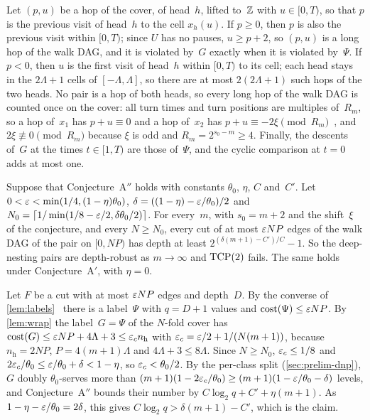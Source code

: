 \begin{informalproof}
Let $(p,u)$ be a hop of the cover, of head~$h$, lifted to~$\mathbb{Z}$ with $u\in[0,T)$, so that $p$ is the previous visit of
head~$h$ to the cell $x_h(u)$. If $p\ge0$, then $p$ is also the previous visit within $[0,T)$; since $U$ has no pauses,
$u\ge p+2$, so $(p,u)$ is a long hop of the walk DAG, and it is violated by~$G$ exactly when it is violated by~$\Psi$. If
$p<0$, then $u$ is the first visit of head~$h$ within $[0,T)$ to its cell; each head stays in the $2\Lambda+1$ cells of
$[-\Lambda,\Lambda]$, so there are at most $2(2\Lambda+1)$ such hops of the two heads. No pair is a hop of both heads, so
every long hop of the walk DAG is counted once on the cover: all turn times and turn positions are multiples of~$R_m$, so
a hop of~$x_1$ has $p+u\equiv0$ and a hop of~$x_2$ has $p+u\equiv-2\xi\pmod{R_m}$~\cite[Remark~5.23]{FourthPaper2026}, and
$2\xi\not\equiv0\pmod{R_m}$ because $\xi$ is odd and $R_m=2^{s_0-m}\ge4$. Finally, the descents of~$G$ at the times
$t\in[1,T)$ are those of~$\Psi$, and the cyclic comparison at $t=0$ adds at most one.
\end{informalproof}

\begin{corollary}\label{cor:wrap}
\notformalized
Suppose that Conjecture~A$''$ holds with constants $\theta_0$, $\eta$, $C$ and~$C'$. Let $0<\varepsilon<\min(1/4,(1-\eta)\theta_0)$,
$\delta=((1-\eta)-\varepsilon/\theta_0)/2$ and $N_0=\lceil1/\min(1/8-\varepsilon/2,\delta\theta_0/2)\rceil$. For every~$m$, with $s_0=m+2$
and the shift~$\xi$ of the conjecture, and every $N\ge N_0$, every cut of at most $\varepsilon NP$ edges of the walk DAG of the
pair on $[0,NP)$ has depth at least $2^{(\delta(m+1)-C')/C}-1$. So the deep-nesting pairs are depth-robust as $m\to\infty$
and $\mathrm{TCP}(2)$ fails. The same holds under Conjecture~A$'$, with $\eta=0$.
\end{corollary}

\begin{informalproof}
Let $F$ be a cut with at most $\varepsilon NP$ edges and depth~$D$. By the converse of \cref{lem:labels}~\cite[Lemma~5.2]{FourthPaper2026}
there is a label~$\Psi$ with $q=D+1$ values and $\mathrm{cost}(\Psi)\le\varepsilon NP$. By \cref{lem:wrap} the label~$G=\Psi$ of the
$N$-fold cover has $\mathrm{cost}(G)\le\varepsilon NP+4\Lambda+3\le\varepsilon_cn_{\mathrm h}$ with $\varepsilon_c=\varepsilon/2+1/(N(m+1))$, because
$n_{\mathrm h}=2NP$, $P=4(m+1)\Lambda$ and $4\Lambda+3\le8\Lambda$. Since $N\ge N_0$, $\varepsilon_c\le1/8$ and
$2\varepsilon_c/\theta_0\le\varepsilon/\theta_0+\delta<1-\eta$, so $\varepsilon_c<\theta_0/2$. By the per-class split
(\cref{sec:prelim-dnp}), $G$ doubly $\theta_0$-serves more than $(m+1)(1-2\varepsilon_c/\theta_0)\ge(m+1)(1-\varepsilon/\theta_0-\delta)$
levels, and Conjecture~A$''$ bounds their number by $C\log_2q+C'+\eta(m+1)$. As $1-\eta-\varepsilon/\theta_0=2\delta$, this gives
$C\log_2q>\delta(m+1)-C'$, which is the claim.
\end{informalproof}

